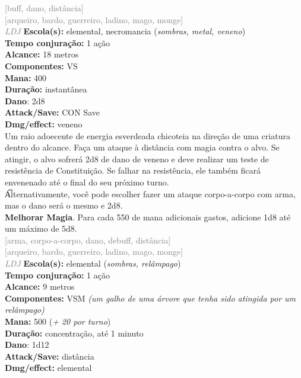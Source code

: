 \documentclass{RPG_Adventure}[2021/10/20]
\begin{document}
{\scriptsize \textcolor{gray}{[buff, dano, distância]\\}}
{\scriptsize \textcolor{gray}{[arqueiro, bardo, guerreiro, ladino, mago, monge]\\}}
{\tiny \textcolor{gray}{\textit{LDJ}}}
{\small \t \textbf{Escola(s):} elemental, necromancia (\textit{sombras, metal, veneno})\\\t \textbf{Tempo conjuração:} 1 ação\\\t \textbf{Alcance:} 18 metros\\\t \textbf{Componentes:} VS\\\t \textbf{Mana:} 400\\\t \textbf{Duração:} instantânea\\\t \textbf{Dano}: 2d8\\\t \textbf{Attack/Save:} CON Save\\\t \textbf{Dmg/effect:} veneno\\}
{\normalsize Um raio adoecente de energia esverdeada chicoteia na direção de uma criatura dentro do alcance. Faça um ataque à distância com magia contra o alvo. Se atingir, o alvo sofrerá 2d8 de dano de veneno e deve realizar um teste de resistência de Constituição. Se falhar na resistência, ele também ficará envenenado até o final do seu próximo turno.\\\t Alternativamente, você pode escolher fazer um ataque corpo-a-corpo com arma, mas o dano será o mesmo e 2d8.\\\t \textbf{Melhorar Magia}. Para cada 550 de mana adicionais gastos, adicione 1d8 até um máximo de 5d8.\\}
{\scriptsize \textcolor{gray}{[arma, corpo-a-corpo, dano, debuff, distância]\\}}
{\scriptsize \textcolor{gray}{[arqueiro, bardo, guerreiro, ladino, mago, monge]\\}}
{\tiny \textcolor{gray}{\textit{LDJ}}}
{\small \t \textbf{Escola(s):} elemental (\textit{sombras, relâmpago})\\\t \textbf{Tempo conjuração:} 1 ação\\\t \textbf{Alcance:} 9 metros\\\t \textbf{Componentes:} VSM \textit{(um galho de uma árvore que tenha sido atingida por um relâmpago)}\\\t \textbf{Mana:} 500 (\textit{+ 20 por turno})\\\t \textbf{Duração:} concentração, até 1 minuto\\\t \textbf{Dano}: 1d12\\\t \textbf{Attack/Save:} distância\\\t \textbf{Dmg/effect:} elemental\\}
\end{document}
